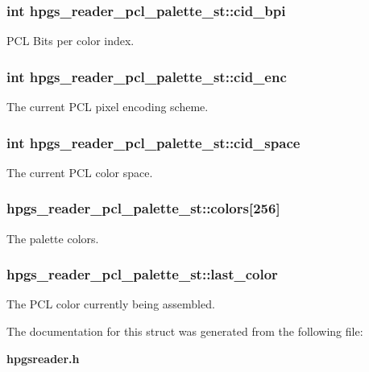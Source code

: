 \subsubsection[{cid\_\-bpi}]{\setlength{\rightskip}{0pt plus 5cm}int {\bf hpgs\_\-reader\_\-pcl\_\-palette\_\-st::cid\_\-bpi}}\label{structhpgs__reader__pcl__palette__st_afcf9de2306283e738215d312455cc222}
PCL Bits per color index. 
\subsubsection[{cid\_\-enc}]{\setlength{\rightskip}{0pt plus 5cm}int {\bf hpgs\_\-reader\_\-pcl\_\-palette\_\-st::cid\_\-enc}}\label{structhpgs__reader__pcl__palette__st_ae5087fbe950254566bfabdd670d727d8}
The current PCL pixel encoding scheme. 
\subsubsection[{cid\_\-space}]{\setlength{\rightskip}{0pt plus 5cm}int {\bf hpgs\_\-reader\_\-pcl\_\-palette\_\-st::cid\_\-space}}\label{structhpgs__reader__pcl__palette__st_ace3db697f9516fac5a49520703121254}
The current PCL color space. 
\subsubsection[{colors}]{ {\bf hpgs\_\-reader\_\-pcl\_\-palette\_\-st::colors}[256]}\label{structhpgs__reader__pcl__palette__st_a4efdd1a3a0373c21a1c98b64033f15d9}
The palette colors. 
\subsubsection[{last\_\-color}]{ {\bf hpgs\_\-reader\_\-pcl\_\-palette\_\-st::last\_\-color}}\label{structhpgs__reader__pcl__palette__st_a50da3dcb4c2daf88010b738911974067}
The PCL color currently being assembled. 

The documentation for this struct was generated from the following file:\begin{DoxyCompactItemize}
\item 
{\bf hpgsreader.h}\end{DoxyCompactItemize}
